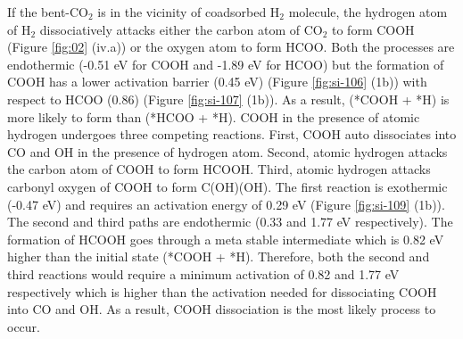 If the bent-CO$_2$ is in the vicinity of coadsorbed H$_2$ molecule, the hydrogen atom of H$_2$ dissociatively attacks either the carbon atom of CO$_2$ to form COOH (Figure \ref{fig:02} (iv.a)) or the oxygen atom to form HCOO. Both the processes are endothermic (-0.51 eV for COOH and -1.89 eV for HCOO) but the formation of COOH has a lower activation barrier (0.45 eV) (Figure \ref{fig:si-106} (1b)) with respect to HCOO (0.86) (Figure \ref{fig:si-107} (1b)). As a result, (*COOH + *H) is more likely to form than (*HCOO + *H). COOH in the presence of atomic hydrogen undergoes three competing reactions. First, COOH auto dissociates into CO and OH in the presence of hydrogen atom. Second, atomic hydrogen attacks the carbon atom of COOH to form HCOOH. Third, atomic hydrogen attacks carbonyl oxygen of COOH to form C(OH)(OH). The first reaction is exothermic (-0.47 eV) and requires an activation energy of 0.29 eV (Figure \ref{fig:si-109} (1b)). The second and third paths are endothermic (0.33 and 1.77 eV respectively). The formation of HCOOH goes through a meta stable intermediate which is 0.82 eV higher than the initial state (*COOH + *H). Therefore, both the second and third reactions would require a minimum activation of 0.82 and  1.77 eV respectively which is higher than the activation needed for dissociating COOH into CO and OH. As a result, COOH dissociation is the most likely process to occur. 
